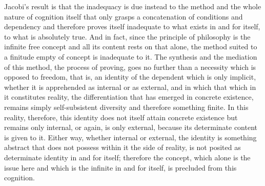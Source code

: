 Jacobi's result is that the inadequacy is
due instead to the method
and the whole nature of cognition itself
that only grasps a concatenation of
conditions and dependency
and therefore proves itself inadequate
to what exists in and for itself,
to what is absolutely true.
And in fact, since the principle of philosophy is
the infinite free concept
and all its content rests on that alone,
the method suited to a finitude empty of concept is
inadequate to it.
The synthesis and the mediation of this method,
the process of proving, goes no further than a
necessity which is opposed to freedom,
that is, an identity of the dependent
which is only implicit,
whether it is apprehended as internal or as external,
and in which that which in it constitutes reality,
the differentiation that has emerged in concrete existence,
remains simply self-subsistent diversity
and therefore something finite.
In this reality, therefore, this identity does
not itself attain concrete existence
but remains only internal,
or again, is only external,
because its determinate content is given to it.
Either way, whether internal or external,
the identity is something abstract
that does not possess within it the side of reality,
is not posited as determinate
identity in and for itself;
therefore the concept,
which alone is the issue here
and which is the infinite
in and for itself,
is precluded from this cognition.


